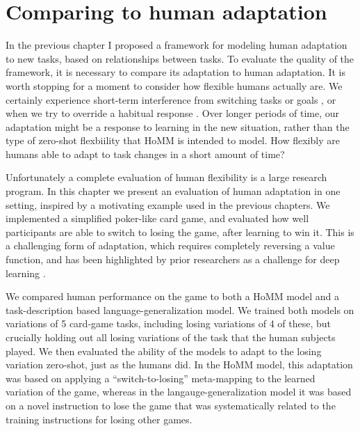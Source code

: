 \chapter{Comparing to human adaptation} \label{chapter:human}

In the previous chapter I proposed a framework for modeling human adaptation to new tasks, based on relationships between tasks. To evaluate the quality of the framework, it is necessary to compare its adaptation to human adaptation. It is worth stopping for a moment to consider how flexible humans actually are. We certainly experience short-term interference from switching tasks or goals \citep{Rogers1995}, or when we try to override a habitual response \citep{Stroop1935, MacLeod1991}. Over longer periods of time, our adaptation might be a response to learning in the new situation, rather than the type of zero-shot flexbiility that HoMM is intended to model. How flexibly are humans able to adapt to task changes in a short amount of time? \par
Unfortunately a complete evaluation of human flexibility is a large research program. In this chapter we present an evaluation of human adaptation in one setting, inspired by a motivating example used in the previous chapters. We implemented a simplified poker-like card game, and evaluated how well participants are able to switch to losing the game, after learning to win it. This is a challenging form of adaptation, which requires completely reversing a value function, and has been highlighted by prior researchers as a challenge for deep learning \citep{Lake2016}.\par
We compared human performance on the game to both a HoMM model and a task-description based language-generalization model. We trained both models on variations of 5 card-game tasks, including losing variations of 4 of these, but crucially holding out all losing variations of the task that the human subjects played. We then evaluated the ability of the models to adapt to the losing variation zero-shot, just as the humans did. In the HoMM model, this adaptation was based on applying a ``switch-to-losing'' meta-mapping to the learned variation of the game, whereas in the langauge-generalization model it was based on a novel instruction to lose the game that was systematically related to the training instructions for losing other games.\par 

